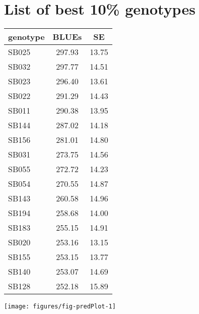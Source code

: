 \documentclass[a4paper,11pt]{article}\usepackage[]{graphicx}\usepackage[]{color}
\makeatletter
\def\maxwidth{ %
  \ifdim\Gin@nat@width>\linewidth
    \linewidth
  \else
    \Gin@nat@width
  \fi
}
\newenvironment{knitrout}{}{} %
\makeatother
\begin{document}
\section{List of best 10\% genotypes}

\begin{multicols*}{2}
\begin{tabular}{lcc}
  \hline
genotype & BLUEs & SE \\ 
  \hline
SB025 & 297.93 & 13.75 \\ 
  SB032 & 297.77 & 14.51 \\ 
  SB023 & 296.40 & 13.61 \\ 
  SB022 & 291.29 & 14.43 \\ 
  SB011 & 290.38 & 13.95 \\ 
  SB144 & 287.02 & 14.18 \\ 
  SB156 & 281.01 & 14.80 \\ 
  SB031 & 273.75 & 14.56 \\ 
  SB055 & 272.72 & 14.23 \\ 
  SB054 & 270.55 & 14.87 \\ 
  SB143 & 260.58 & 14.96 \\ 
  SB194 & 258.68 & 14.00 \\ 
  SB183 & 255.15 & 14.91 \\ 
  SB020 & 253.16 & 13.15 \\ 
  SB155 & 253.15 & 13.77 \\ 
  SB140 & 253.07 & 14.69 \\ 
  SB128 & 252.18 & 15.89 \\ 
   \hline
\end{tabular}

\columnbreak
\begin{knitrout}
\color{fgcolor}

{\centering \texttt{[image: figures/fig-predPlot-1]} 

}



\end{knitrout}
\end{multicols*}


\end{document}
